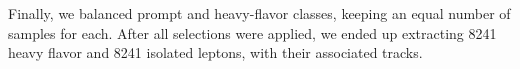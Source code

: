
Finally, we balanced prompt and heavy-flavor classes, keeping an equal number of samples for each. After all selections were applied, we ended up extracting 8241 heavy flavor and 8241 isolated leptons, with their associated tracks.

